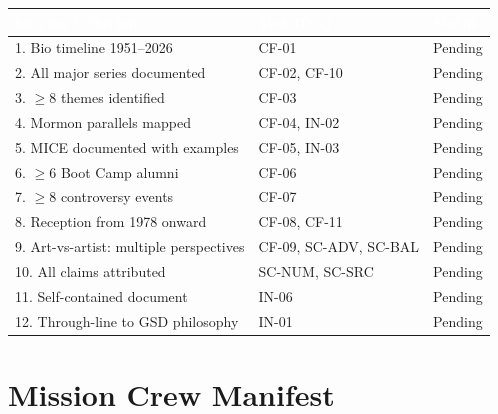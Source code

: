\documentclass[11pt,letterpaper]{article}
\newcommand{\tableheader}[1]{\textbf{\sffamily\textcolor{white}{#1}}}
\begin{document}
\begin{center}
\begin{tabularx}{\textwidth}{XL{3.5cm}C{1.5cm}}
\toprule
{}
\tableheader{Success Criterion} & \tableheader{Test ID(s)} & \tableheader{Status} \\
. Bio timeline 1951--2026 & CF-01 & Pending \\
2. All major series documented & CF-02, CF-10 & Pending \\
3. $\geq$8 themes identified & CF-03 & Pending \\
4. Mormon parallels mapped & CF-04, IN-02 & Pending \\
5. MICE documented with examples & CF-05, IN-03 & Pending \\
6. $\geq$6 Boot Camp alumni & CF-06 & Pending \\
7. $\geq$8 controversy events & CF-07 & Pending \\
8. Reception from 1978 onward & CF-08, CF-11 & Pending \\
9. Art-vs-artist: multiple perspectives & CF-09, SC-ADV, SC-BAL & Pending \\
10. All claims attributed & SC-NUM, SC-SRC & Pending \\
11. Self-contained document & IN-06 & Pending \\
12. Through-line to GSD philosophy & IN-01 & Pending \\
\bottomrule
\end{tabularx}
\end{center}

\section{Mission Crew Manifest}
\end{document}

